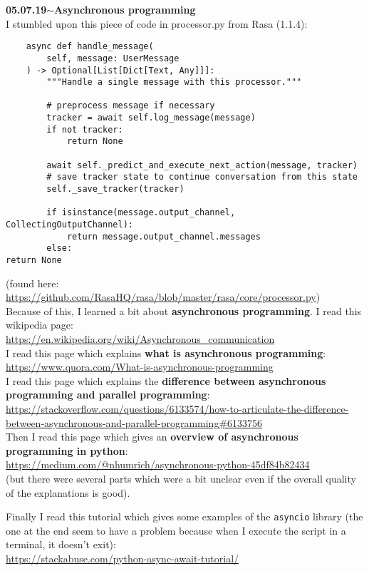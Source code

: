 \documentclass[11pt,a4paper]{article}
\newenvironment{loggentry}[2]%
{\noindent\textbf{#1}\hspace{1cm}$\mathbf{\sim}$\text{ }\textbf{#2}\\}{\vspace{0.5cm}}
\begin{document}
\begin{loggentry}{05.07.19}{Asynchronous programming}

I stumbled upon this piece of code in processor.py from Rasa  (1.1.4):
\begin{verbatim}
    async def handle_message(
        self, message: UserMessage
    ) -> Optional[List[Dict[Text, Any]]]:
        """Handle a single message with this processor."""

        # preprocess message if necessary
        tracker = await self.log_message(message)
        if not tracker:
            return None

        await self._predict_and_execute_next_action(message, tracker)
        # save tracker state to continue conversation from this state
        self._save_tracker(tracker)

        if isinstance(message.output_channel, CollectingOutputChannel):
            return message.output_channel.messages
        else:
return None
\end{verbatim}
(found here:\\
\url{https://github.com/RasaHQ/rasa/blob/master/rasa/core/processor.py})\\

Because of this, I learned a bit about \textbf{asynchronous programming}. I read this wikipedia page:\\
\url{https://en.wikipedia.org/wiki/Asynchronous_communication}\\

I read this page which explains \textbf{what is asynchronous programming}:\\
\url{https://www.quora.com/What-is-asynchronous-programming}\\

I read this page which explains the \textbf{difference between asynchronous programming and parallel programming}:\\
\url{https://stackoverflow.com/questions/6133574/how-to-articulate-the-difference-between-asynchronous-and-parallel-programming#6133756}\\

Then I read this page which gives an \textbf{overview of asynchronous programming in python}:\\
\url{https://medium.com/@nhumrich/asynchronous-python-45df84b82434}\\
(but there were several parts which were a bit unclear even if the overall quality of the explanations is good).

Finally I read this tutorial which gives some examples of the \texttt{asyncio} library (the one at the end seem to have a problem because when I execute the script in a terminal, it doesn't exit):\\ \url{https://stackabuse.com/python-async-await-tutorial/}\\


\end{loggentry}
\end{document}
